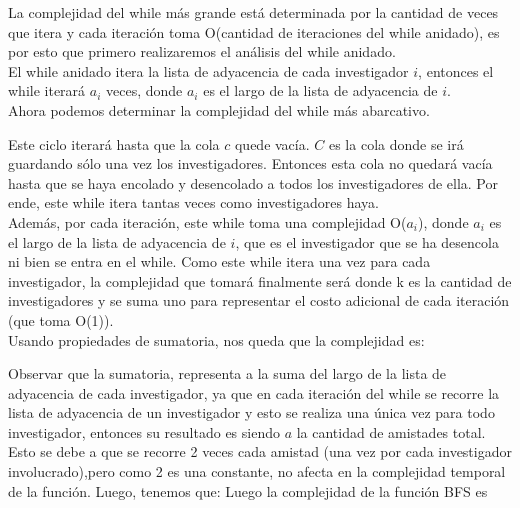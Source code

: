 \indent La complejidad del while más grande está determinada por la cantidad de
veces que itera 
y cada iteración toma O(cantidad de iteraciones del while anidado), es por esto
que
primero realizaremos el análisis del while anidado.\\

\indent El while anidado itera la lista de adyacencia de cada investigador $i$,
entonces
el while iterará $a_i$ veces, donde $a_i$ es el largo
de la lista de adyacencia de $i$.\\

\indent Ahora podemos determinar la complejidad del while más abarcativo. 

\indent Este ciclo iterará hasta que la cola $c$ quede vacía. $C$ es la cola
donde se irá guardando
sólo una vez los investigadores. Entonces esta cola no quedará vacía hasta que
se haya encolado y desencolado 
a todos los investigadores de ella. Por ende, este while itera tantas veces como
investigadores haya.\\

\indent Además, por cada iteración, este while toma una complejidad O($a_i$),
donde $a_i$ es el largo
de la lista de adyacencia de $i$, que es el
investigador que se ha desencola ni bien se entra en el while. Como este while
itera una vez para cada investigador,
la complejidad que tomará finalmente será 
 donde k es la cantidad de investigadores y se
suma uno para representar el costo adicional de cada iteración (que toma
O(1)).\\

Usando propiedades de sumatoria, nos queda que la complejidad es:

\indent Observar que la sumatoria, representa a la suma del largo de la lista de
adyacencia de cada investigador, ya que en cada iteración del while se recorre
la lista de adyacencia de un investigador y esto se realiza una única vez para
todo investigador, entonces su resultado es 
siendo $a$ la cantidad de amistades total. Esto se debe a que se recorre 2 veces
cada
amistad (una vez por cada investigador involucrado),pero como 2 es una
constante, no afecta
en la complejidad temporal de la función. Luego, tenemos que:
Luego la complejidad de la función BFS es 



